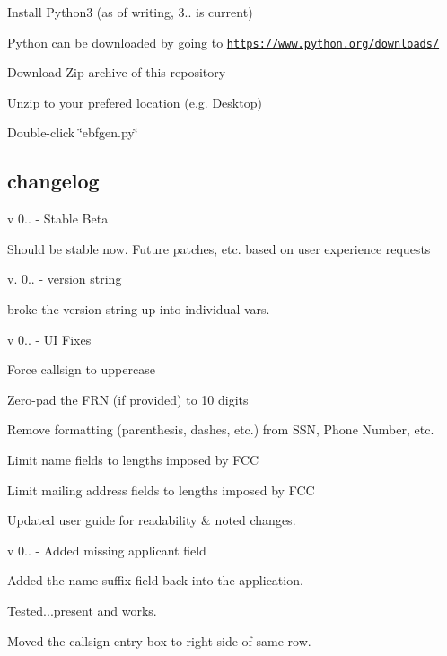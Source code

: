 \begin{DoxyItemize}
\item Install Python3 (as of writing, 3.. is current)
\begin{DoxyItemize}
\item Python can be downloaded by going to \href{https://www.python.org/downloads/}{\tt https\+://www.\+python.\+org/downloads/}
\end{DoxyItemize}
\item Download Zip archive of this repository
\item Unzip to your prefered location (e.\+g. Desktop)
\item Double-\/click \char`\"{}ebfgen.\+py\char`\"{}
\end{DoxyItemize}

\subsection*{changelog}

v 0.. -\/ Stable Beta
\begin{DoxyItemize}
\item Should be stable now. Future patches, etc. based on user experience requests
\end{DoxyItemize}

v. 0.. -\/ version string
\begin{DoxyItemize}
\item broke the version string up into individual vars.
\end{DoxyItemize}

v 0.. -\/ UI Fixes
\begin{DoxyItemize}
\item Force callsign to uppercase
\item Zero-\/pad the F\+RN (if provided) to 10 digits
\item Remove formatting (parenthesis, dashes, etc.) from S\+SN, Phone Number, etc.
\item Limit name fields to lengths imposed by F\+CC
\item Limit mailing address fields to lengths imposed by F\+CC
\item Updated user guide for readability \& noted changes.
\end{DoxyItemize}

v 0.. -\/ Added missing applicant field
\begin{DoxyItemize}
\item Added the name suffix field back into the application.
\item Tested...present and works.
\item Moved the callsign entry box to right side of same row.
\end{DoxyItemize}

